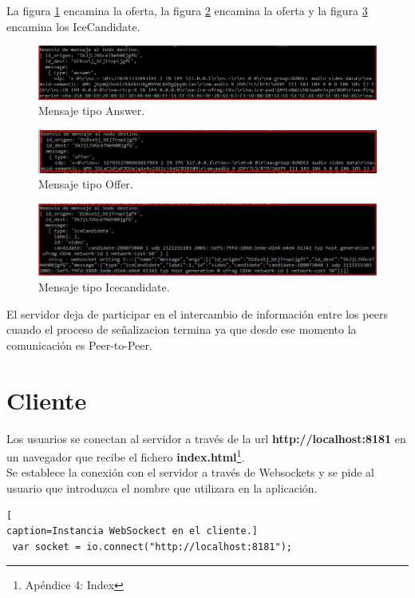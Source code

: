 La figura \ref{fig:AnswerServer} encamina la oferta, la figura \ref{fig:OfferServer} encamina la oferta y la figura \ref{fig:IceCandidateVideos} encamina los IceCandidate.
\begin{figure}[!h]
\begin{center}
   \includegraphics[width=0.8\linewidth]{Figures/AnswerServer}
	\decoRule
	\caption[Request/Replay conexión Servidor]{Mensaje tipo Answer.}
\label{fig:AnswerServer}
\end{center}
\end{figure}
\begin{figure}[!h]
\begin{center}
   \includegraphics[width=0.8\linewidth]{Figures/OfferServer}
	\decoRule
	\caption[Request/Replay conexión Servidor]{Mensaje tipo Offer.}
\label{fig:OfferServer}
\end{center}
\end{figure}
\begin{figure}[!h]
\begin{center}
   \includegraphics[width=0.8\linewidth]{Figures/IceCandidateVideos}
	\decoRule
	\caption[Request/Replay conexión Servidor]{Mensaje tipo Icecandidate.}
\label{fig:IceCandidateVideos}
\end{center}
\end{figure}
El servidor deja de participar en el intercambio de información entre los peers cuando el proceso de señalizacion termina ya que desde ese momento la comunicación es Peer-to-Peer.
\section{Cliente}
Los usuarios se conectan al servidor a través de la url \textbf{http://localhost:8181} en un navegador que recibe el fichero \textbf{index.html}\footnote{Apéndice 4: Index}.
\\Se establece la conexión con el servidor a través de Websockets y se pide al usuario que introduzca el nombre que utilizara en la aplicación.
\begin{lstlisting}[
caption=Instancia WebSockect en el cliente.]
 var socket = io.connect("http://localhost:8181");
\end{lstlisting}
